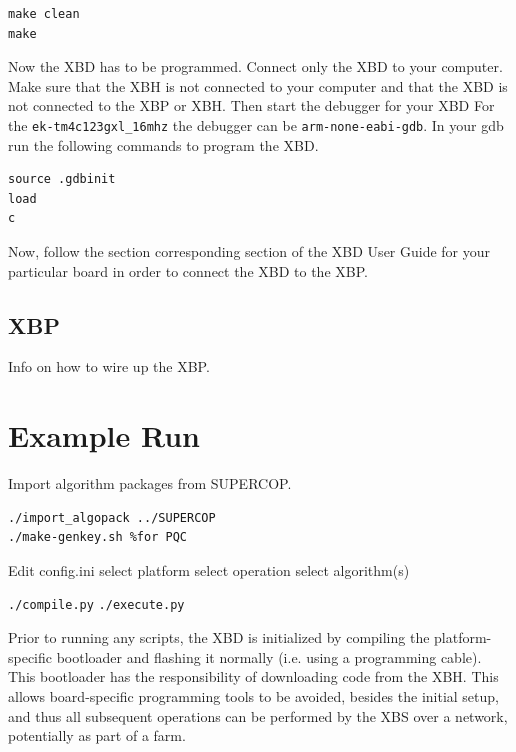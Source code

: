 \documentclass[twoside,11pt]{cergdoc}
\begin{document}
\begin{lstlisting}
make clean
make
\end{lstlisting}

%

Now the XBD has to be programmed. Connect only the XBD to your computer.
Make sure that the XBH is not connected to your computer and that the XBD is not
connected to the XBP or XBH. Then start the debugger for your XBD
For the \verb|ek-tm4c123gxl_16mhz| the debugger can be \texttt{arm-none-eabi-gdb}.
In your gdb run the following commands to program the XBD.

\begin{lstlisting}
source .gdbinit
load
c
\end{lstlisting}

Now, follow the section corresponding section of the XBD User Guide for your particular board
in order to connect the XBD to the XBP.

  \subsection{XBP}
Info on how to wire up the XBP.

  \section{Example Run}
Import algorithm packages from SUPERCOP.

\begin{lstlisting}
./import_algopack ../SUPERCOP
./make-genkey.sh %for PQC
\end{lstlisting}
Edit config.ini
select platform
select operation
select algorithm(s)

\verb|./compile.py|
\verb|./execute.py|

Prior to running any scripts, the XBD is initialized by compiling the
platform-specific bootloader and flashing it normally (i.e. using a programming
cable). 
This bootloader has the responsibility of downloading code from the XBH. This allows board-specific
programming tools to be avoided, besides the initial setup, and thus all
subsequent operations can be performed by the XBS over a network, potentially as
part of a farm.
\end{document}

